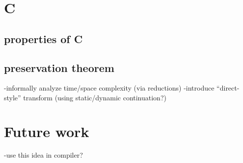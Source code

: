 \documentclass[ms,electronic,twosidetoc,letterpaper,chaptercenter,parttop]{byumsphd}
\begin{document}












\section{C}
\subsection{properties of C}
\subsection{preservation theorem}
-informally analyze time/space complexity (via reductions)
-introduce ``direct-style'' transform (using static/dynamic continuation?)
\section{Future work}
-use this idea in compiler?
\end{document}
